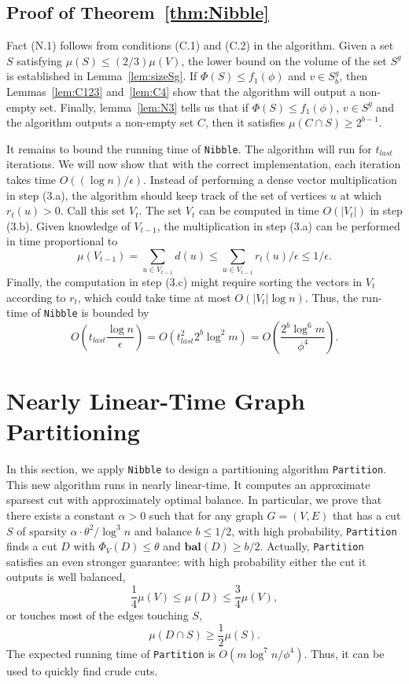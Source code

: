 \documentclass[11pt]{article}
\def\balance#1{\textbf{bal}\left(#1\right)}
\def\intersect{\cap}
\def\sizeof#1{\left|#1  \right|}
\def\intersect{\cap}
\def\vol#1{\mu \left(#1  \right)}
\begin{document}
\subsection{Proof of Theorem~\ref{thm:Nibble}}

Fact (N.1) follows from conditions (C.1) and (C.2)
  in the algorithm.
Given a set $S$ satisfying $\vol{S} \leq (2/3) \vol{V}$,
  the lower bound on the volume of the set $S^{g}$
  is established in Lemma~\ref{lem:sizeSg}.
If $\Phi (S) \leq f_{1} (\phi )$ and $v \in S^{g}_{b}$,
  then Lemmas~\ref{lem:C123} and~\ref{lem:C4} show that
  the algorithm will output a non-empty set.
Finally, lemma~\ref{lem:N3} tells us that if $\Phi (S) \leq f_{1} (\phi)$,
  $v \in S^{g}$ and the algorithm outputs a non-empty set $C$,
  then it satisfies $\vol{C \intersect S} \geq 2^{b-1}$.

It remains to bound the running time of \texttt{Nibble}.
The algorithm will run for $t_{last}$
  iterations.
We will now show that with the correct implementation, each iteration
  takes time $O ((\log n)/ \epsilon)$.
Instead of performing a dense vector multiplication in step (3.a),
  the algorithm should keep track of the set of vertices $u$
  at which $r_{t} (u) > 0$.
Call this set $V_{t}$.
The set $V_{t}$ can be computed in time $O (\sizeof{V_{t}})$
  in step (3.b).
Given knowledge of $V_{t-1}$, the multiplication in step (3.a)
  can be performed in time proportional to 
\[
  \vol{V_{t-1}} =
\sum_{u \in V_{t-1}} d (u)
\leq
\sum_{u \in V_{t-1}} r_{t}(u) / \epsilon
\leq
1/ \epsilon .
\]
Finally, the computation in step (3.c) might require sorting the vectors
  in $V_{t}$ according to $r_{t}$, which could take time at most
  $O (\sizeof{V_{t}} \log n)$.
Thus, the run-time of \texttt{Nibble} is bounded by
\[
O \left(t_{last}
  \frac{\log n}{ \epsilon }
  \right)
=
O \left( t_{last}^{2}
  2^{b} \log^{2} m
  \right)
= O \left(
 \frac{2^{b} \log^{6} m}{\phi^{4}}
 \right).
\]


\section{Nearly Linear-Time Graph Partitioning}\label{sec:cut}

In this section, we apply \texttt{Nibble} to design a partitioning
  algorithm \texttt{Partition}.
This new algorithm runs in nearly linear-time.
It computes an approximate sparsest
  cut with approximately optimal balance.
In particular, we prove that there exists a constant $\alpha > 0$
  such that for any graph $G = (V,E)$ that has a cut $S$ of sparsity 
  $\alpha \cdot \theta^2/\log^3 n $
  and balance $b \leq 1/2$, with high probability, \texttt{Partition} finds a
  cut $D$ with $\Phi_{V} (D) \leq  \theta$  and
  $\balance{D} \geq b/2$.
Actually, \texttt{Partition} satisfies an even stronger
  guarantee: with high probability
  either the cut it outputs is well balanced,
\[
\frac{1}{4}\vol{V} \leq \vol{D}\leq
  \frac{3}{4}\vol{V},
\]
or touches most of the edges touching $S$,
\[
\vol{D \intersect S} \geq \frac{1}{2}\vol{S}.
\]
The expected running time of \texttt{Partition} is $O (m\log^{7} n/\phi^{4})$.
Thus, it can be used to quickly find crude cuts.
\end{document}
